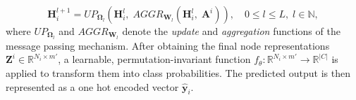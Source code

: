 \begin{equation}
\mathbf{H}^{l+1}_i = UP_{\mathbf{\Omega}_l}\left(\mathbf{H}^{l}_i,\; AGGR_{\mathbf{W}_l}\left(\mathbf{H}^{l}_i,\; \mathbf{A}^i\right)\right), \quad 0 \leq l \leq L,\; l \in \mathbb{N},
\end{equation}
where $UP_{\mathbf{\Omega}_l}$ and $AGGR_{\mathbf{W}_l}$ denote the \textit{update} and \textit{aggregation} functions of the message passing mechanism.
After obtaining the final node representations \( \mathbf{Z}^i \in \mathbb{R}^{N_i \times m'} \), a learnable, permutation-invariant function \( f_{\theta}: \mathbb{R}^{N_i \times m'} \rightarrow \mathbb{R}^{|C|} \) is applied to transform them into class probabilities. The predicted output is then represented as a one hot encoded vector \( \mathbf{\hat{y}}_i \).



